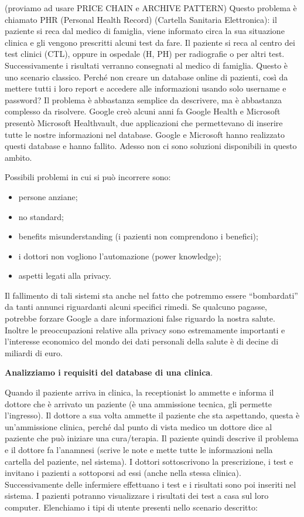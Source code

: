 (proviamo ad usare PRICE CHAIN e ARCHIVE PATTERN) 
Questo problema è chiamato PHR (Personal Health Record) (Cartella Sanitaria Elettronica): il paziente si reca dal medico di famiglia, viene informato circa la sua situazione clinica e gli vengono prescritti alcuni test da fare. Il paziente si reca al centro dei test clinici (CTL), oppure in ospedale (H, PH) per radiografie o per altri test. Successivamente i risultati verranno consegnati al medico di famiglia. Questo è uno scenario classico.  
Perché non creare un database online di pazienti, così da mettere tutti i loro report e accedere alle informazioni usando solo username e password? Il problema è abbastanza semplice da descrivere, ma è abbastanza complesso da risolvere. Google creò alcuni anni fa Google Health e Microsoft presentò Microsoft Healthvault, due applicazioni che permettevano di inserire tutte le nostre informazioni nel database. Google e Microsoft hanno realizzato questi database e hanno fallito. Adesso non ci sono soluzioni disponibili in questo ambito.   

Possibili problemi in cui si può incorrere sono:

\begin{itemize}

\item persone anziane;
\item no standard;
\item benefits misunderstanding (i pazienti non comprendono i benefici);
\item i dottori non vogliono l’automazione (power knowledge);
\item aspetti legati alla privacy.

\end{itemize}

Il fallimento di tali sistemi sta anche nel fatto che potremmo essere “bombardati” da tanti annunci riguardanti alcuni specifici rimedi. Se qualcuno pagasse, potrebbe forzare Google a dare informazioni false riguardo la nostra salute. Inoltre le preoccupazioni relative alla privacy sono estremamente importanti e l’interesse economico del mondo dei dati personali della salute è di decine di miliardi di euro. 

\textbf{Analizziamo i requisiti del database di una clinica}.

Quando il paziente arriva in clinica, la receptionist lo ammette e informa il dottore che è arrivato un paziente (è una ammissione tecnica, gli permette l’ingresso). Il dottore a sua volta ammette il paziente che sta aspettando, questa è un’ammissione clinica, perché dal punto di vista medico un dottore dice al paziente che può iniziare una cura/terapia. Il paziente quindi descrive il problema e il dottore fa l’anamnesi (scrive le note e mette tutte le informazioni nella cartella del paziente, nel sistema). I dottori sottoscrivono la prescrizione, i test e invitano i pazienti a sottoporsi ad essi (anche nella stessa clinica). Successivamente delle infermiere effettuano i test e i risultati sono poi inseriti nel sistema. I pazienti potranno visualizzare i risultati dei test a casa sul loro computer.  
Elenchiamo i tipi di utente presenti nello scenario descritto:

